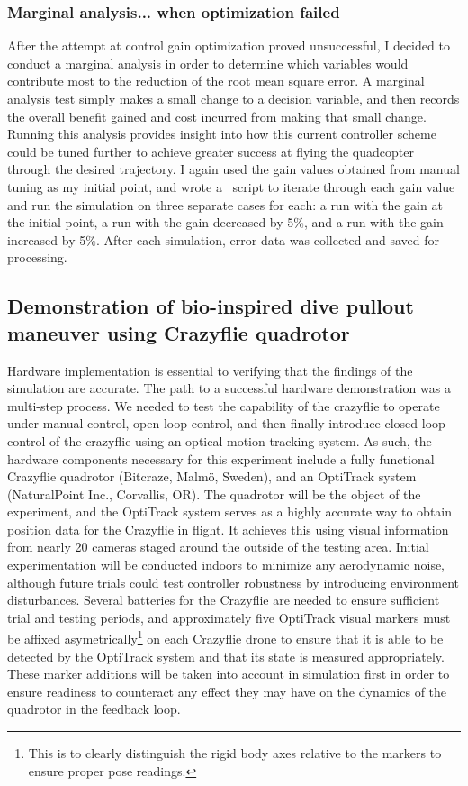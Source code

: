 \subsubsection{Marginal analysis... when optimization failed}
After the attempt at control gain optimization proved unsuccessful, I decided to conduct a marginal analysis in order to determine which variables would contribute most to the reduction of the root mean square error. A marginal analysis test simply makes a small change to a decision variable, and then records the overall benefit gained and cost incurred from making that small change. Running this analysis provides insight into how this current controller scheme could be tuned further to achieve greater success at flying the quadcopter through the desired trajectory. I again used the gain values obtained from manual tuning as my initial point, and wrote a \MATLAB\ script to iterate through each gain value and run the simulation on three separate cases for each: a run with the gain at the initial point, a run with the gain decreased by 5\%, and a run with the gain increased by 5\%. After each simulation, error data was collected and saved for processing. 








\subsection{Demonstration of bio-inspired dive pullout maneuver using Crazyflie quadrotor}
Hardware implementation is essential to verifying that the findings of the simulation are accurate. The path to a successful hardware demonstration was a multi-step process. We needed to test the capability of the crazyflie to operate under manual control, open loop control, and then finally introduce closed-loop control of the crazyflie using an optical motion tracking system. As such, the hardware components necessary for this experiment include a fully functional Crazyflie quadrotor (Bitcraze, Malm\"{o}, Sweden), and an OptiTrack system (NaturalPoint Inc., Corvallis, OR). The quadrotor will be the object of the experiment, and the OptiTrack system serves as a highly accurate way to obtain position data for the Crazyflie in flight. It achieves this using visual information from nearly 20 cameras staged around the outside of the testing area. Initial experimentation will be conducted indoors to minimize any aerodynamic noise, although future trials could test controller robustness by introducing environment disturbances. Several batteries for the Crazyflie are needed to ensure sufficient trial and testing periods, and approximately five OptiTrack visual markers must be affixed asymetrically\footnote{This is to clearly distinguish the rigid body axes relative to the markers to ensure proper pose readings.} on each Crazyflie drone to ensure that it is able to be detected by the OptiTrack system and that its state is measured appropriately. These marker additions will be taken into account in simulation first in order to ensure readiness to counteract any effect they may have on the dynamics of the quadrotor in the feedback loop.

